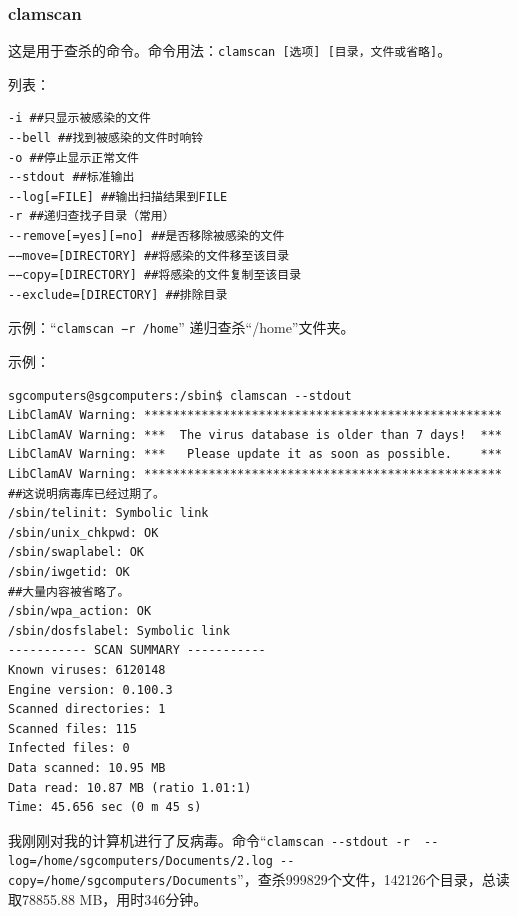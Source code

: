 \subsubsection{clamscan}
\cite{mancs}\par
这是用于查杀的命令。命令用法：\verb|clamscan [选项] [目录，文件或省略]|。\par
[选项]列表：\par
\begin{verbatim}
-i ##只显示被感染的文件
--bell ##找到被感染的文件时响铃
-o ##停止显示正常文件
--stdout ##标准输出
--log[=FILE] ##输出扫描结果到FILE
-r ##递归查找子目录（常用）
--remove[=yes][=no] ##是否移除被感染的文件
−−move=[DIRECTORY] ##将感染的文件移至该目录
−−copy=[DIRECTORY] ##将感染的文件复制至该目录
--exclude=[DIRECTORY] ##排除目录
\end{verbatim} \par
示例：“\verb|clamscan −r /home|”  递归查杀“/home”文件夹。\par
示例：
\begin{verbatim}
sgcomputers@sgcomputers:/sbin$ clamscan --stdout
LibClamAV Warning: **************************************************
LibClamAV Warning: ***  The virus database is older than 7 days!  ***
LibClamAV Warning: ***   Please update it as soon as possible.    ***
LibClamAV Warning: **************************************************
##这说明病毒库已经过期了。
/sbin/telinit: Symbolic link
/sbin/unix_chkpwd: OK
/sbin/swaplabel: OK
/sbin/iwgetid: OK
##大量内容被省略了。
/sbin/wpa_action: OK
/sbin/dosfslabel: Symbolic link
----------- SCAN SUMMARY -----------
Known viruses: 6120148
Engine version: 0.100.3
Scanned directories: 1
Scanned files: 115
Infected files: 0
Data scanned: 10.95 MB
Data read: 10.87 MB (ratio 1.01:1)
Time: 45.656 sec (0 m 45 s)
\end{verbatim} \par
{\color{red}{注意，我非常建议你使用root权限！否则大部分病毒会移除失败！\par 误报率较高，建议不要使用“\verb|--remove=yes|”或“\verb|--move=[dir]|”选项。}}\par
我刚刚对我的计算机进行了反病毒。命令“\verb|clamscan --stdout -r  --log=/home/sgcomputers/Documents/2.log --copy=/home/sgcomputers/Documents|”，查杀999829个文件，142126个目录，总读取78855.88 MB，用时346分钟。
